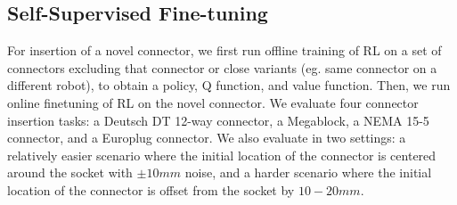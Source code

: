 



\subsection{Self-Supervised Fine-tuning}
\label{sec:finetuningexps}

For insertion of a novel connector, we first run offline training of RL on a set of connectors excluding that connector or close variants (eg. same connector on a different robot), to obtain a policy, Q function, and value function.
Then, we run online finetuning of RL on the novel connector.
We evaluate four connector insertion tasks: a Deutsch DT 12-way connector, a Megablock, a NEMA 15-5 connector, and a Europlug connector.
We also evaluate in two settings: a relatively easier scenario where the initial location of the connector is centered around the socket with $\pm10mm$ noise, and a harder scenario where the initial location of the connector is offset from the socket by $10-20mm$.


